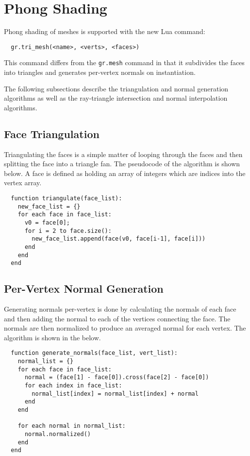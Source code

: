 \section{Phong Shading}

Phong shading of meshes is supported with the new Lua command:
\begin{lstlisting}
  gr.tri_mesh(<name>, <verts>, <faces>)
\end{lstlisting}
This command differs from the \verb|gr.mesh| command in that it subdivides the
faces into triangles and generates per-vertex normals on instantiation.

The following subsections describe the triangulation and normal generation
algorithms as well as the ray-triangle intersection and normal interpolation
algorithms. 

\subsection{Face Triangulation}
Triangulating the faces is a simple matter of looping through the faces and then
splitting the face into a triangle fan. The pseudocode of the algorithm is shown
below. A face is defined as holding an array of integers which are indices into
the vertex array.

\begin{lstlisting}
  function triangulate(face_list):
    new_face_list = {}
    for each face in face_list:
      v0 = face[0];
      for i = 2 to face.size():
        new_face_list.append(face(v0, face[i-1], face[i]))
      end
    end
  end
\end{lstlisting}

\subsection{Per-Vertex Normal Generation}
Generating normals per-vertex is done by calculating the normals of each face
and then adding the normal to each of the vertices connecting the face. The
normals are then normalized to produce an averaged normal for each vertex. The
algorithm is shown in the below.

\begin{lstlisting}
  function generate_normals(face_list, vert_list):
    normal_list = {}
    for each face in face_list:
      normal = (face[1] - face[0]).cross(face[2] - face[0])
      for each index in face_list:
        normal_list[index] = normal_list[index] + normal
      end
    end

    for each normal in normal_list:
      normal.normalized()
    end
  end
\end{lstlisting}

